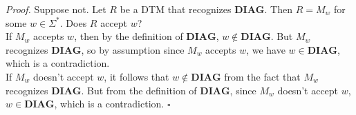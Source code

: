 \documentclass[a4paper]{article}
\newenvironment{proof}{\begin{breakbox}\textit{Proof.}}{\hfill$\square$\end{breakbox}}
\newcommand{\nl}{\vspace{0.2cm}\\}
\newcommand{\mf}{\mathbf}
\begin{document}
\begin{proof}
    Suppose not. Let $R$ be a DTM that recognizes $\mf{DIAG}$. Then $R = M_w$ for some $w \in \Sigma^*$. Does $R$ accept $w$?\nl
    If $M_w$ accepts $w$, then by the definition of $\mf{DIAG}$, $w \not\in \mf{DIAG}$. But $M_w$ recognizes $\mf{DIAG}$, so by assumption since $M_w$ accepts $w$, we have $w \in
    \mf{DIAG}$, which is a contradiction.\nl
    If $M_w$ doesn't accept $w$, it follows that $w \not\in \mf{DIAG}$ from the fact that $M_w$ recognizes $\mf{DIAG}$. But from the definition of $\mf{DIAG}$, since $M_w$ doesn't accept $w$, $w \in
    \mf{DIAG}$, which is a contradiction.
\end{proof}
\end{document}
